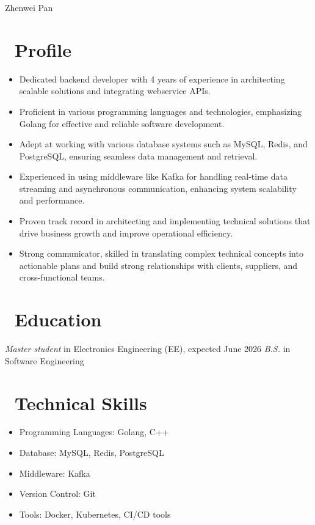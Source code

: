 \documentclass{resume}
\begin{document}

\begin{center}
    {\huge Zhenwei Pan} \\ \vspace{2pt} 
\end{center}


\section{\faUser\ Profile}
\begin{itemize}
    \item Dedicated backend developer with 4 years of experience in architecting scalable solutions and integrating webservice APIs.
    \item Proficient in various programming languages and technologies, emphasizing Golang for effective and reliable software development.
    \item Adept at working with various database systems such as MySQL, Redis, and PostgreSQL, ensuring seamless data management and retrieval.
    \item Experienced in using middleware like Kafka for handling real-time data streaming and asynchronous communication, enhancing system scalability and performance.
    \item Proven track record in architecting and implementing technical solutions that drive business growth and improve operational efficiency.
    \item Strong communicator, skilled in translating complex technical concepts into actionable plans and build strong relationships with clients, suppliers, and cross-functional teams.
\end{itemize}


\section{\faGraduationCap\ Education}
\textit{Master student} in Electronics Engineering (EE), expected June 2026
\textit{B.S.} in Software Engineering

\section{\faCogs\ Technical Skills}
\begin{itemize}[parsep=0.5ex]
  \item Programming Languages: Golang, C++
  \item Database: MySQL, Redis, PostgreSQL
  \item Middleware: Kafka
  \item Version Control: Git
  \item Tools: Docker, Kubernetes, CI/CD tools
\end{itemize}
\end{document}
